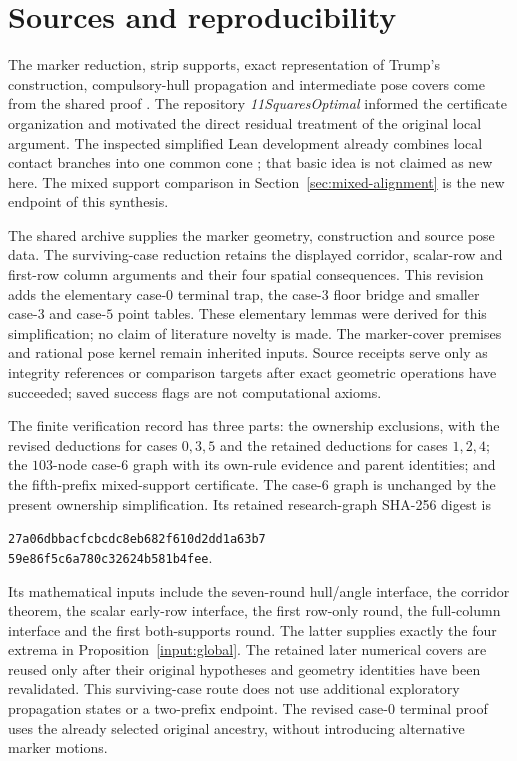 \documentclass[11pt]{article}
\begin{document}
\section{Sources and reproducibility}\label{sec:reproducibility}
The marker reduction, strip supports, exact representation of Trump's
construction, compulsory-hull propagation and intermediate pose covers
come from the shared proof \cite{shared}. The repository
\emph{11SquaresOptimal} \cite{repository} informed the certificate
organization and motivated the direct residual treatment of the original
local argument.
The inspected simplified Lean development already combines local contact
branches into one common cone \cite{formalized}; that basic idea is not
claimed as new here. The mixed support comparison in
Section~\ref{sec:mixed-alignment} is the new endpoint of this synthesis.

The shared archive supplies the marker geometry, construction and source
pose data. The surviving-case reduction retains the displayed corridor,
scalar-row and first-row column arguments and their four spatial
consequences. This revision adds the elementary case-$0$ terminal trap,
the case-$3$ floor bridge and smaller case-$3$ and case-$5$ point tables.
These elementary lemmas were derived for this simplification; no claim
of literature novelty is made. The marker-cover premises and rational
pose kernel remain inherited inputs. Source receipts serve only
as integrity references or comparison targets after exact geometric
operations have succeeded; saved success flags are not computational axioms.

The finite verification record has three parts: the ownership exclusions,
with the revised deductions for cases $0,3,5$ and the retained deductions
for cases $1,2,4$; the $103$-node case-$6$ graph with its own-rule evidence
and parent identities; and the fifth-prefix mixed-support certificate.
The case-$6$ graph is unchanged by the present ownership simplification.
Its retained research-graph SHA-256 digest is
\begin{center}\small\texttt{27a06dbbacfcbcdc8eb682f610d2dd1a63b7}\\
\texttt{59e86f5c6a780c32624b581b4fee}.\end{center}
Its mathematical inputs include the seven-round hull/angle interface,
the corridor theorem, the scalar early-row interface, the first row-only
round, the full-column interface and the first both-supports round.
The latter supplies exactly the four extrema in
Proposition~\ref{input:global}. The retained later numerical covers are
reused only after their original hypotheses and geometry identities have
been revalidated. This surviving-case route does not use additional
exploratory propagation states or a two-prefix endpoint. The revised
case-$0$ terminal proof uses the already selected original ancestry,
without introducing alternative marker motions.
\end{document}
